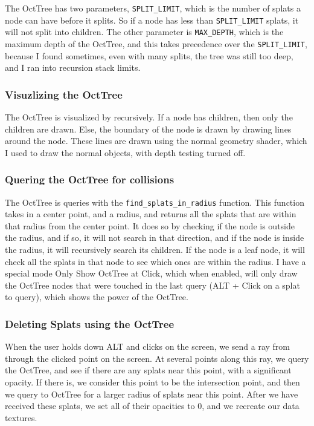 \documentclass {article}
\begin{document}
The OctTree has two parameters, \lstinline[style=inlinecode]{SPLIT_LIMIT}, which is the number of splats a node can have before it splits. So if a node has less than \lstinline[style=inlinecode]{SPLIT_LIMIT} splats, it will not split into children. The other parameter is \lstinline[style=inlinecode]{MAX_DEPTH}, which is the maximum depth of the OctTree, and this takes precedence over the \lstinline[style=inlinecode]{SPLIT_LIMIT}, because I found sometimes, even with many splits, the tree was still too deep, and I ran into recursion stack limits.



\subsubsection{Visuzlizing the OctTree}

The OctTree is visualized by recursively. If a node has children, then only the children are drawn. Else, the boundary of the node is drawn by drawing lines around the node. These lines are drawn using the normal geometry shader, which I used to draw the normal objects, with depth testing turned off.


\subsubsection{Quering the OctTree for collisions}
The OctTree is queries with the \lstinline[style=inlinecode]{find_splats_in_radius} function. This function takes in a center point, and a radius, and returns all the splats that are within that radius from the center point. It does so by checking if the node is outside the radius, and if so, it will not search in that direction, and if the node is inside the radius, it will recursively search its children. If the node is a leaf node, it will check all the splats in that node to see which ones are within the radius. I have a special mode Only Show OctTree at Click, which when enabled, will only draw the OctTree nodes that were touched in the last query (ALT + Click on a splat to query), which shows the power of the OctTree.



\subsubsection{Deleting Splats using the OctTree}
When the user holds down ALT and clicks on the screen, we send a ray from through the clicked point on the screen. At several points along this ray, we query the OctTree, and see if there are any splats near this point, with a significant opacity. If there is, we consider this point to be the intersection point, and then we query to OctTree for a larger radius of splats near this point. After we have received these splats, we set all of their opacities to 0, and we recreate our data textures. 
\end{document}
